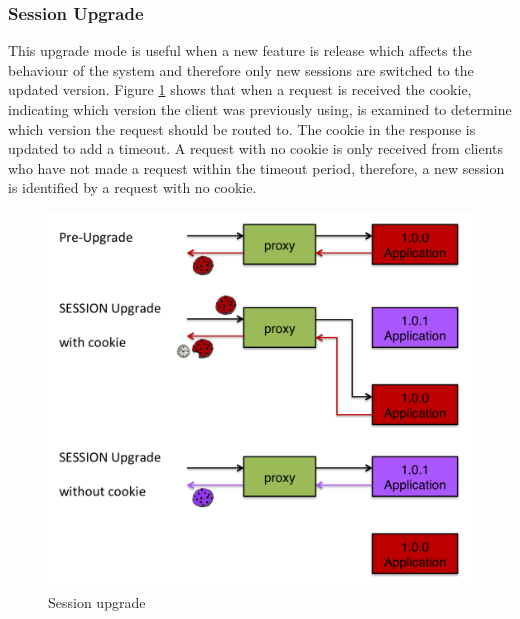 \documentclass[a4paper,11pt,twoside]{report}
\begin{document}
\subsubsection*{Session Upgrade}
This upgrade mode is useful when a new feature is release which affects the behaviour of the system and therefore only new sessions are switched to the updated version. Figure \ref{session_upgrade} shows that when a request is received the cookie, indicating which version the client was previously using, is examined to determine which version the request should be routed to.  The cookie in the response is updated to add a timeout.  A request with no cookie is only received from clients who have not made a request within the timeout period, therefore, a new session is identified by a request with no cookie.

   
\begin{figure}[!ht]
  \centering
     \includegraphics[scale=0.30]{session_upgrade}
  \caption{Session upgrade}
  \label{session_upgrade}
\end{figure}
\end{document}
